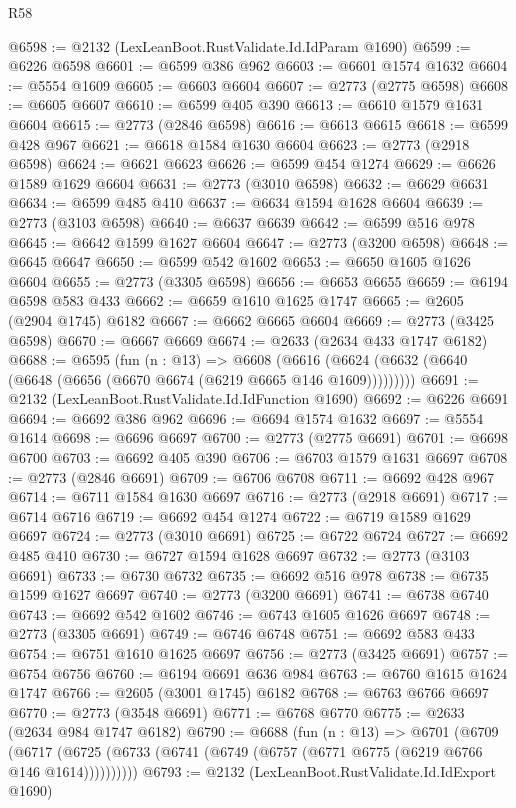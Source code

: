 \begin{lexlean}{R58}
\begin{coremodule}
@6598 := @2132 (LexLeanBoot.RustValidate.Id.IdParam @1690)
@6599 := @6226 @6598
@6601 := @6599 @386 @962
@6603 := @6601 @1574 @1632
@6604 := @5554 @1609
@6605 := @6603 @6604
@6607 := @2773 (@2775 @6598)
@6608 := @6605 @6607
@6610 := @6599 @405 @390
@6613 := @6610 @1579 @1631 @6604
@6615 := @2773 (@2846 @6598)
@6616 := @6613 @6615
@6618 := @6599 @428 @967
@6621 := @6618 @1584 @1630 @6604
@6623 := @2773 (@2918 @6598)
@6624 := @6621 @6623
@6626 := @6599 @454 @1274
@6629 := @6626 @1589 @1629 @6604
@6631 := @2773 (@3010 @6598)
@6632 := @6629 @6631
@6634 := @6599 @485 @410
@6637 := @6634 @1594 @1628 @6604
@6639 := @2773 (@3103 @6598)
@6640 := @6637 @6639
@6642 := @6599 @516 @978
@6645 := @6642 @1599 @1627 @6604
@6647 := @2773 (@3200 @6598)
@6648 := @6645 @6647
@6650 := @6599 @542 @1602
@6653 := @6650 @1605 @1626 @6604
@6655 := @2773 (@3305 @6598)
@6656 := @6653 @6655
@6659 := @6194 @6598 @583 @433
@6662 := @6659 @1610 @1625 @1747
@6665 := @2605 (@2904 @1745) @6182
@6667 := @6662 @6665 @6604
@6669 := @2773 (@3425 @6598)
@6670 := @6667 @6669
@6674 := @2633 (@2634 @433 @1747 @6182)
@6688 := @6595
    (fun (n : @13) =>
    @6608 (@6616 (@6624 (@6632 (@6640 (@6648 (@6656 (@6670 @6674 (@6219 @6665 @146 @1609)))))))))
@6691 := @2132 (LexLeanBoot.RustValidate.Id.IdFunction @1690)
@6692 := @6226 @6691
@6694 := @6692 @386 @962
@6696 := @6694 @1574 @1632
@6697 := @5554 @1614
@6698 := @6696 @6697
@6700 := @2773 (@2775 @6691)
@6701 := @6698 @6700
@6703 := @6692 @405 @390
@6706 := @6703 @1579 @1631 @6697
@6708 := @2773 (@2846 @6691)
@6709 := @6706 @6708
@6711 := @6692 @428 @967
@6714 := @6711 @1584 @1630 @6697
@6716 := @2773 (@2918 @6691)
@6717 := @6714 @6716
@6719 := @6692 @454 @1274
@6722 := @6719 @1589 @1629 @6697
@6724 := @2773 (@3010 @6691)
@6725 := @6722 @6724
@6727 := @6692 @485 @410
@6730 := @6727 @1594 @1628 @6697
@6732 := @2773 (@3103 @6691)
@6733 := @6730 @6732
@6735 := @6692 @516 @978
@6738 := @6735 @1599 @1627 @6697
@6740 := @2773 (@3200 @6691)
@6741 := @6738 @6740
@6743 := @6692 @542 @1602
@6746 := @6743 @1605 @1626 @6697
@6748 := @2773 (@3305 @6691)
@6749 := @6746 @6748
@6751 := @6692 @583 @433
@6754 := @6751 @1610 @1625 @6697
@6756 := @2773 (@3425 @6691)
@6757 := @6754 @6756
@6760 := @6194 @6691 @636 @984
@6763 := @6760 @1615 @1624 @1747
@6766 := @2605 (@3001 @1745) @6182
@6768 := @6763 @6766 @6697
@6770 := @2773 (@3548 @6691)
@6771 := @6768 @6770
@6775 := @2633 (@2634 @984 @1747 @6182)
@6790 := @6688
    (fun (n : @13) =>
    @6701
      (@6709
        (@6717 (@6725 (@6733 (@6741 (@6749 (@6757 (@6771 @6775 (@6219 @6766 @146 @1614))))))))))
@6793 := @2132 (LexLeanBoot.RustValidate.Id.IdExport @1690)

\end{coremodule}
\end{lexlean}
